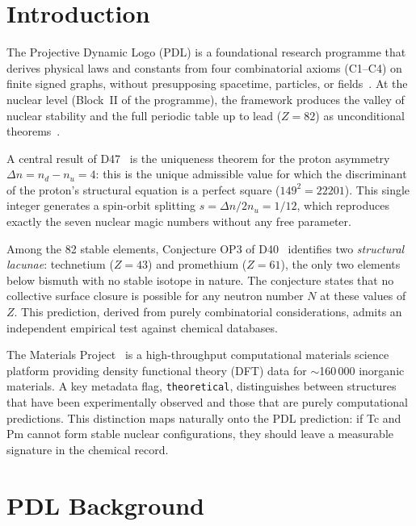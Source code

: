 \documentclass[11pt,a4paper]{article}
\theoremstyle{definition}
\theoremstyle{remark}
\begin{document}
\section{Introduction}
\label{sec:intro}

The Projective Dynamic Logo (PDL) is a foundational research programme that derives physical laws and constants from four combinatorial axioms (C1--C4) on finite signed graphs, without presupposing spacetime, particles, or fields~\cite{Laubscher_DS01_2025}. At the nuclear level (Block~II of the programme), the framework produces the valley of nuclear stability and the full periodic table up to lead ($Z=82$) as unconditional theorems~\cite{Laubscher_D40_2025,Laubscher_D47_2025}.

A central result of D47~\cite{Laubscher_D47_2025} is the uniqueness theorem for the proton asymmetry $\Delta n = n_d - n_u = 4$: this is the unique admissible value for which the discriminant of the proton's structural equation is a perfect square ($149^2 = 22201$). This single integer generates a spin-orbit splitting $s = \Delta n / 2n_u = 1/12$, which reproduces exactly the seven nuclear magic numbers without any free parameter.

Among the 82 stable elements, Conjecture OP3 of D40~\cite{Laubscher_D40_2025} identifies two \emph{structural lacunae}: technetium ($Z=43$) and promethium ($Z=61$), the only two elements below bismuth with no stable isotope in nature. The conjecture states that no collective surface closure is possible for any neutron number $N$ at these values of $Z$. This prediction, derived from purely combinatorial considerations, admits an independent empirical test against chemical databases.

The Materials Project~\cite{Jain_2013} is a high-throughput computational materials science platform providing density functional theory (DFT) data for $\sim$160\,000 inorganic materials. A key metadata flag, \texttt{theoretical}, distinguishes between structures that have been experimentally observed and those that are purely computational predictions. This distinction maps naturally onto the PDL prediction: if Tc and Pm cannot form stable nuclear configurations, they should leave a measurable signature in the chemical record.

\section{PDL Background}
\label{sec:pdl}
\end{document}
